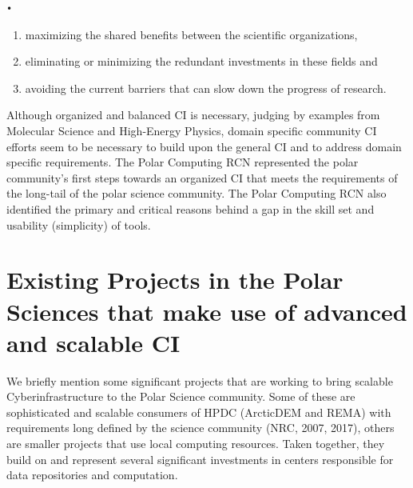 \texttt{•}\documentclass[10pt,letterpaper,draft]{article}
\begin{document}
\begin{enumerate}[label=\roman*., itemsep=0pt, topsep=0pt]

\item maximizing the shared benefits between the scientific organizations,
\item eliminating or minimizing the redundant investments in these fields and
\item avoiding the current barriers that can slow down the progress of research.
\end{enumerate}
Although organized and balanced CI is necessary, judging by examples from Molecular Science and High-Energy Physics, domain specific community CI efforts seem to be necessary to build upon the general CI and to address domain specific requirements. The Polar Computing RCN represented the polar community's first steps towards an organized CI that meets the requirements of the long-tail of the polar science community. The Polar Computing RCN also identified the primary and critical reasons behind a gap in the skill set and usability (simplicity) of tools.


\section{Existing Projects in the Polar Sciences that make use of advanced and scalable CI}

We briefly mention some significant projects that are working to bring scalable Cyberinfrastructure to the Polar Science community. Some of these are sophisticated and scalable consumers of HPDC (ArcticDEM and REMA) with requirements long defined by the science community (NRC, 2007, 2017), others are smaller projects that use local computing resources. Taken together, they build on and represent several significant investments in centers responsible for data repositories and computation.
\end{document}

